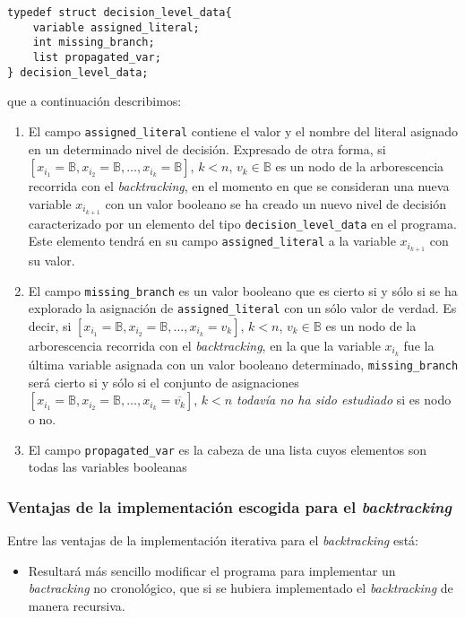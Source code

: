 \documentclass[12pt,lettersize]{article}
\begin{document}
\begin{lstlisting}
typedef struct decision_level_data{
    variable assigned_literal;
    int missing_branch;                                                
    list propagated_var;
} decision_level_data;
\end{lstlisting}
que a continuación describimos:
\vspace{-2.5mm}
\begin{enumerate}
\item El campo {\tt assigned\_literal} contiene el valor y el nombre del literal
  asignado en un determinado nivel de decisión. Expresado de otra forma,  si
  $[x_{i_1}=\mathbb{B},x_{i_2}=\mathbb{B},\ldots, x_{i_k} = \mathbb{B} ]$, $k< n$, $v_k
  \in \mathbb{B}$ es un nodo de la arborescencia recorrida con el
  \emph{backtracking}, en el momento en que se consideran una nueva variable
  $x_{i_{k+1}}$ con un valor booleano se ha creado un nuevo nivel de decisión
  caracterizado por un elemento del tipo {\tt decision\_level\_data} en el
  programa. Este elemento tendrá en su campo {\tt assigned\_literal} a la
  variable $x_{i_{k+1}}$ con su valor.
\item El campo {\tt missing\_branch} es un valor booleano que es cierto si y
  sólo si se ha explorado la asignación de {\tt assigned\_literal} con un
  sólo valor de verdad. Es decir, si
  $[x_{i_1}=\mathbb{B},x_{i_2}=\mathbb{B},\ldots, x_{i_k} = v_k ]$, $k< n$, $v_k
  \in \mathbb{B}$ es un nodo de la arborescencia recorrida con el
  \emph{backtracking}, en la que la variable $x_{i_k}$ fue la última variable
  asignada con un valor booleano determinado, {\tt missing\_branch} será cierto
  si y sólo si el conjunto de asignaciones
  $[x_{i_1}=\mathbb{B},x_{i_2}=\mathbb{B},\ldots, x_{i_k} = \overline{v_k} ]$,
  $k<n$ \emph{todavía no ha sido estudiado} si es nodo o no.

\item El campo {\tt propagated\_var} es la cabeza de una lista cuyos elementos
  son todas las variables booleanas 
\end{enumerate}

\subsubsection{Ventajas de la implementación escogida para el
  \emph{backtracking}}\label{VentajasBacktracking}
Entre las ventajas de la implementación iterativa para el \emph{backtracking} está:
\vspace{-2.5mm}
\begin{itemize}
  \item Resultará más sencillo modificar el programa para implementar un
    \emph{bactracking} no cronológico, que si se hubiera implementado el
    \emph{backtracking} de manera recursiva.
\end{itemize}
\end{document}
